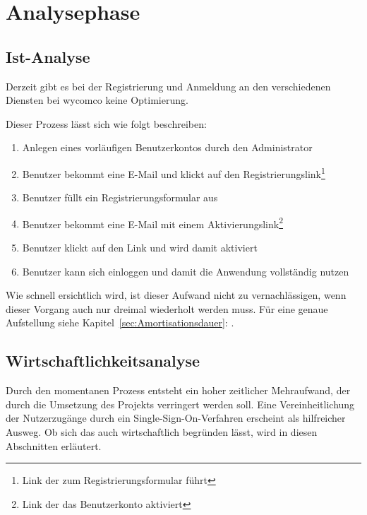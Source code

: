 \section{Analysephase} 
\label{sec:Analysephase}


\subsection{Ist-Analyse} 
\label{sec:IstAnalyse}

Derzeit gibt es bei der Registrierung und Anmeldung an den verschiedenen Diensten bei wycomco keine Optimierung. 

Dieser Prozess lässt sich wie folgt beschreiben:
\begin{enumerate}
	\item Anlegen eines vorläufigen Benutzerkontos durch den Administrator
	\item Benutzer bekommt eine E-Mail und klickt auf den Registrierungslink\footnote{Link der zum Registrierungsformular führt}
	\item Benutzer füllt ein Registrierungsformular aus
	\item Benutzer bekommt eine E-Mail mit einem Aktivierungslink\footnote{Link der das Benutzerkonto aktiviert}
	\item Benutzer klickt auf den Link und wird damit aktiviert
	\item Benutzer kann sich einloggen und damit die Anwendung vollständig nutzen
\end{enumerate}

Wie schnell ersichtlich wird, ist dieser Aufwand nicht zu vernachlässigen, wenn dieser Vorgang auch nur dreimal wiederholt werden muss. Für eine genaue Aufstellung siehe Kapitel~\ref{sec:Amortisationsdauer}: .

\subsection{Wirtschaftlichkeitsanalyse}
\label{sec:Wirtschaftlichkeitsanalyse}

Durch den momentanen Prozess entsteht ein hoher zeitlicher Mehraufwand, der durch die Umsetzung des Projekts verringert werden soll.
Eine Vereinheitlichung der Nutzerzugänge durch ein Single-Sign-On-Verfahren erscheint als hilfreicher Ausweg.
Ob sich das auch wirtschaftlich begründen lässt, wird in diesen Abschnitten erläutert.

